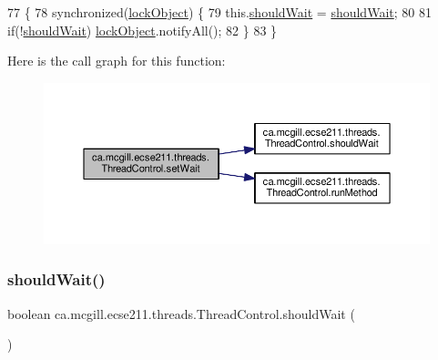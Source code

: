 \begin{DoxyCode}
77                                           \{
78     \textcolor{keyword}{synchronized}(\hyperlink{classca_1_1mcgill_1_1ecse211_1_1threads_1_1_thread_control_ab20c44ff2dafab8981c42fa8bf634dfc}{lockObject}) \{
79       this.\hyperlink{classca_1_1mcgill_1_1ecse211_1_1threads_1_1_thread_control_a9c3896500e86e402b8019e1be6500621}{shouldWait} = \hyperlink{classca_1_1mcgill_1_1ecse211_1_1threads_1_1_thread_control_a9c3896500e86e402b8019e1be6500621}{shouldWait};
80       
81       \textcolor{keywordflow}{if}(!\hyperlink{classca_1_1mcgill_1_1ecse211_1_1threads_1_1_thread_control_a9c3896500e86e402b8019e1be6500621}{shouldWait}) \hyperlink{classca_1_1mcgill_1_1ecse211_1_1threads_1_1_thread_control_ab20c44ff2dafab8981c42fa8bf634dfc}{lockObject}.notifyAll();
82     \}
83   \}
\end{DoxyCode}
Here is the call graph for this function\+:
\nopagebreak
\begin{figure}[H]
\begin{center}
\leavevmode
\includegraphics[width=350pt]{classca_1_1mcgill_1_1ecse211_1_1threads_1_1_thread_control_a7759a6f52b56e15cb37cd25ea31c93c1_cgraph}
\end{center}
\end{figure}
\mbox{\label{classca_1_1mcgill_1_1ecse211_1_1threads_1_1_thread_control_a9c3896500e86e402b8019e1be6500621}} 
\subsubsection{\texorpdfstring{should\+Wait()}{shouldWait()}}
{\footnotesize\ttfamily boolean ca.\+mcgill.\+ecse211.\+threads.\+Thread\+Control.\+should\+Wait (\begin{DoxyParamCaption}{ }\end{DoxyParamCaption})}

